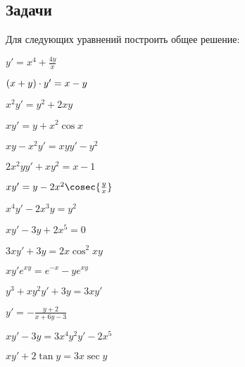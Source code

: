 \subsection{Задачи}
	
	Для следующих уравнений построить общее решение:
	\begin{multicols}{3}
		\begin{enumtasks}

			\label{firstorder:homogeneous}
			\item \( y' = x^4 + \frac{4 y}{x} \) 													%
			\item \( \left( x + y \right) \cdot y' = x - y \)												%
			\item \( x^2 y' = y^2 + 2xy \)															%
			\item \( xy' = y + x^2 \cos{x} \) 														%
			\item \( xy - x^2y' = xyy' - y^2 \) 													%
			\item \( 2x^2 y y' + xy^2 = x - 1 \) 													%
			\item \( xy' = y - 2x^2 \cosec{\frac{y}{x}} \) 											%
			\item \( x^4 y' - 2x^3 y = y^2 \) 														%
			\item \( xy' - 3y + 2x^5 = 0 \) 														%
			\item \( 3xy' + 3y = 2x \cos^2{xy} \) 													%
			\item \( xy' e^{xy} = e^{-x} - ye^{xy} \)												%
			\item \( y^3 + xy^2 y' + 3y = 3xy' \) 													%
			\item \( y' = - \frac{y + 2}{x + 6y - 3} \) 											%
			\item \( xy' - 3y = 3x^4 y^2 y' - 2x^5 \) 												%
 			\item \( xy' + 2\tan{y} = 3x \sec{y} \)													%
			
		\end{enumtasks}
	\end{multicols}

